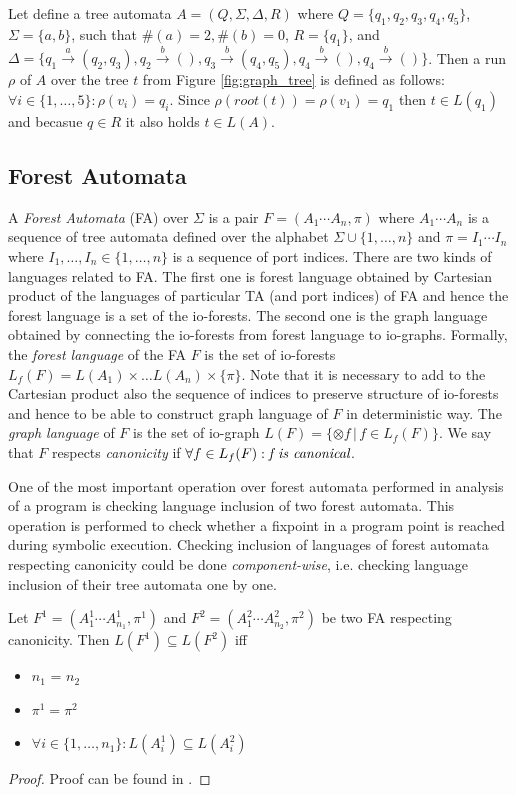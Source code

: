 \bexmp
Let define a tree automata $A=(Q,\Sigma,\Delta, R)$
where $Q=\{q_1,q_2,q_3,q_4,q_5\}$, $\Sigma = \{a,b\}$,
such that $\#(a) = 2, \#(b) =0$, $R=\{q_1\}$,
and $\Delta=\{q_1 \xrightarrow{a} (q_2,q_3), q_2 \xrightarrow{b} (),
q_3 \xrightarrow{b} (q_4,q_5), q_4 \xrightarrow{b} (), q_4 \xrightarrow{b} ()\}$.
Then a run $\rho$ of $A$ over the tree $t$ from Figure \ref{fig:graph_tree}
is defined as follows: $\forall i \in \{1,\ldots,5\}: \rho(v_i) = q_i$.
Since $\rho(root(t)) = \rho(v_1) = q_1$ then $t \in L(q_1)$ and becasue $q \in R$
it also holds $t \in L(A)$.
\label{ex:ta}
\eexmp

\subsection{Forest Automata}
\label{subsec:fa}

A \emph{Forest Automata} (FA) over $\Sigma$ is a pair $F=(A_1\cdots A_n, \pi)$
where $A_1 \cdots A_n$ is a sequence of tree automata defined over the alphabet $\Sigma \cup \{1,\ldots,n\}$
and $\pi = I_1 \cdots I_n$ where $I_1,\ldots, I_n \in \{1, \ldots, n\}$ is a sequence of port indices.
There are two kinds of languages related to FA.
The first one is forest language obtained by Cartesian product of the languages of particular TA (and port indices) of FA
and hence the forest language is a set of the io-forests.
The second one is the graph language obtained by connecting the io-forests from forest language to io-graphs.
Formally, the \emph{forest language} of the FA $F$ is the set of io-forests $L_f(F)= L(A_1) \times \ldots L(A_n) \times \{\pi\}$.
Note that it is necessary to add to the Cartesian product also the sequence of indices to preserve structure of io-forests
and hence to be able to construct graph language of $F$ in deterministic way.
The \emph{graph language} of $F$ is the set of io-graph $L(F) = \{\otimes f\,|\, f \in L_f(F)\}$.
We say that $F$ respects \emph{canonicity} if $\forall f \in L_f(F): \emph{f is canonical}$.

One of the most important operation over forest automata performed in analysis of a program is checking
language inclusion of two forest automata.
This operation is performed to check whether a fixpoint in a program point is reached during symbolic execution.
Checking inclusion of languages of forest automata respecting canonicity could be done \emph{component-wise},
i.e. checking language inclusion of their tree automata one by one.

\begin{lemma}
	Let $F^1 = (A_1^1\cdots A_{n_{1}}^1, \pi^1)$ and $F^2 = (A_1^2\cdots A_{n_{2}}^2, \pi^2)$
	be two FA respecting canonicity.
	Then $L(F^1) \subseteq L(F^2)$ iff
	\begin{itemize}
			\item $n_1$ = $n_2$
			\item $\pi^1 = \pi^2$
			\item $\forall i \in \{1,\ldots,n_1\}: L(A_i^1) \subseteq L(A_i^2)$
	\end{itemize}
\end{lemma}
\begin{proof}
	Proof can be found in \cite{forester:techrep}.
\end{proof}

